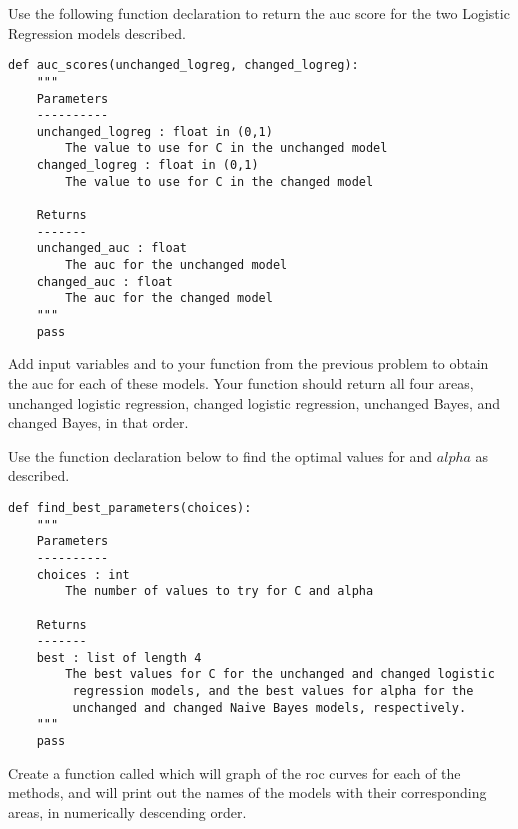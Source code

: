Use the following function declaration to return the auc score for the two Logistic Regression models described.
\begin{lstlisting}
def auc_scores(unchanged_logreg, changed_logreg):
    """
    Parameters
    ----------
    unchanged_logreg : float in (0,1)
        The value to use for C in the unchanged model
    changed_logreg : float in (0,1)
        The value to use for C in the changed model

    Returns
    -------
    unchanged_auc : float
        The auc for the unchanged model
    changed_auc : float
        The auc for the changed model
    """
    pass
\end{lstlisting}

Add input variables  and  to your function from the previous problem to obtain the auc for each of these models.  Your function should return all four areas, unchanged logistic regression, changed logistic regression, unchanged Bayes, and changed Bayes, in that order.

Use the function declaration below to find the optimal values for  and $alpha$ as described.
\begin{lstlisting}
def find_best_parameters(choices):
    """
    Parameters
    ----------
    choices : int
        The number of values to try for C and alpha

    Returns
    -------
    best : list of length 4
        The best values for C for the unchanged and changed logistic
         regression models, and the best values for alpha for the
         unchanged and changed Naive Bayes models, respectively.
    """
    pass
\end{lstlisting}

Create a function called  which will graph of the roc curves for each of the methods, and will print out the names of the models with their corresponding areas, in numerically descending order.
